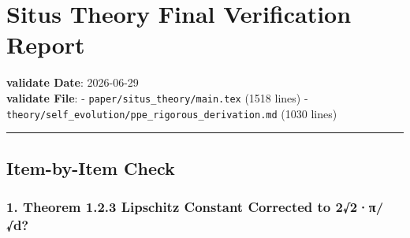 \documentclass[
  12pt,
]{article}
\author{SCX}
\date{2026}
\begin{document}
\section{Situs
Theory Final Verification Report}\label{situs-ux7406ux8bbaux6700ux7ec8ux9a8cux8bc1ux62a5ux544a}

\textbf{validate Date}: 2026-06-29\\
\textbf{validate File}: - \texttt{paper/situs\_theory/main.tex} (1518 lines) -
\texttt{theory/self\_evolution/ppe\_rigorous\_derivation.md} (1030 lines)

\begin{center}\rule{0.5\linewidth}{0.5pt}\end{center}

\subsection{Item-by-Item Check}\label{ux9010ux9879ux68c0ux67e5}

\subsubsection{1. Theorem 1.2.3 Lipschitz Constant Corrected to
2√2·π/√d?}\label{ux5b9aux7406-1.2.3-lipschitz-ux5e38ux6570ux662fux5426ux5df2ux4feeux6b63ux4e3a-22ux3c0d}
\end{document}
